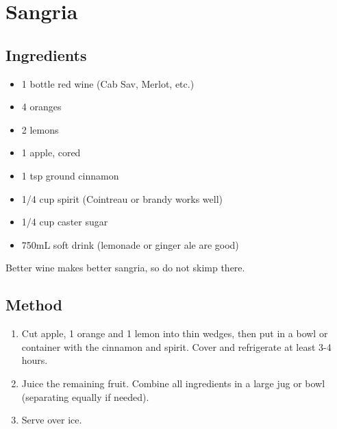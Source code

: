 \clearpage
\section{Sangria}

  
\subsection{Ingredients}

\begin{itemize}
    \item 1 bottle red wine (Cab Sav, Merlot, etc.)
    \item 4 oranges
    \item 2 lemons
    \item 1 apple, cored
    \item 1 tsp ground cinnamon
    \item 1/4 cup spirit (Cointreau or brandy works well)
    \item 1/4 cup caster sugar
    \item 750mL soft drink (lemonade or ginger ale are good)
\end{itemize}

Better wine makes better sangria, so do not skimp there.

\subsection{Method}

\begin{enumerate}
    \item Cut apple, 1 orange and 1 lemon into thin wedges, then put in a bowl or container with the cinnamon and spirit. Cover and refrigerate at least 3-4 hours.
    \item Juice the remaining fruit. Combine all ingredients in a large jug or bowl (separating equally if needed).
    \item Serve over ice.
\end{enumerate}
